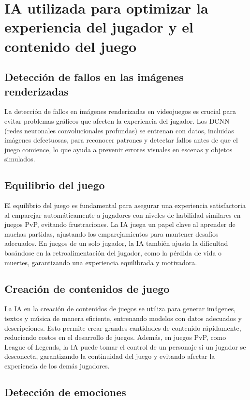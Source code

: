 \documentclass{article}
\begin{document}
\section{IA utilizada para optimizar la experiencia del jugador y el contenido del juego}

\subsection{Detección de fallos en las imágenes renderizadas}

La detección de fallos en imágenes renderizadas en videojuegos es crucial para evitar problemas gráficos que afecten la experiencia del jugador. Los DCNN (redes neuronales convolucionales profundas) se entrenan con datos, incluidas imágenes defectuosas, para reconocer patrones y detectar fallos antes de que el juego comience, lo que ayuda a prevenir errores visuales en escenas y objetos simulados.

\subsection{Equilibrio del juego}

El equilibrio del juego es fundamental para asegurar una experiencia satisfactoria al emparejar automáticamente a jugadores con niveles de habilidad similares en juegos PvP, evitando frustraciones. La IA juega un papel clave al aprender de muchas partidas, ajustando los emparejamientos para mantener desafíos adecuados. En juegos de un solo jugador, la IA también ajusta la dificultad basándose en la retroalimentación del jugador, como la pérdida de vida o muertes, garantizando una experiencia equilibrada y motivadora.

\subsection{Creación de contenidos de juego}
La IA en la creación de contenidos de juegos se utiliza para generar imágenes, textos y música de manera eficiente, entrenando modelos con datos adecuados y descripciones. Esto permite crear grandes cantidades de contenido rápidamente, reduciendo costos en el desarrollo de juegos. Además, en juegos PvP, como League of Legends, la IA puede tomar el control de un personaje si un jugador se desconecta, garantizando la continuidad del juego y evitando afectar la experiencia de los demás jugadores.

\subsection{Detección de emociones}
\end{document}
